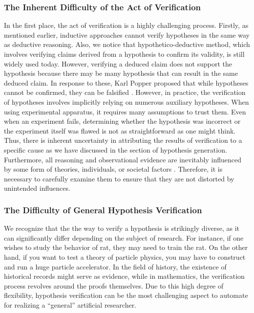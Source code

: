 \documentclass{book}
\begin{document}
\subsubsection{The Inherent Difficulty of the Act of Verification}
In the first place, the act of verification is a highly challenging process. Firstly, as mentioned earlier, inductive approaches cannot verify hypotheses in the same way as deductive reasoning. Also, we notice that hypothetico-deductive method, which involves verifying claims derived from a hypothesis to confirm its validity, is still widely used today. However, verifying a deduced claim does not support the hypothesis because there may be many hypothesis that can result in the same deduced claim. In response to these, Karl Popper proposed that while hypotheses cannot be confirmed, they can be falsified \cite{sep-scientific-method}. However, in practice, the verification of hypotheses involves implicitly relying on numerous auxiliary hypotheses. When using experimental apparatus, it requires many assumptions to trust them. Even when an experiment fails, determining whether the hypothesis was incorrect or the experiment itself was flawed is not as straightforward as one might think. Thus, there is inherent uncertainty in attributing the results of verification to a specific cause \cite{chalmers2013thing,sep-physics-experiment,sep-scientific-underdetermination} as we have discussed in the section of hypothesis generation. Furthermore, all reasoning and observational evidence are inevitably influenced by some form of theories, individuals, or societal factors \cite{sep-science-theory-observation}. Therefore, it is necessary to carefully examine them to ensure that they are not distorted by unintended influences. 

\subsubsection{The Difficulty of General Hypothesis Verification}
We recognize that the the way to verify a hypothesis is strikingly diverse, as it can significantly differ depending on the subject of research. For instance, if one wishes to study the behavior of rat, they may need to train the rat. On the other hand, if you want to test a theory of particle physics, you may have to construct and run a huge particle accelerator. In the field of history, the existence of historical records might serve as evidence, while in mathematics, the verification process revolves around the proofs themselves. Due to this high degree of flexibility, hypothesis verification can be the most challenging aspect to automate for realizing a ``general'' artificial researcher.
\end{document}

